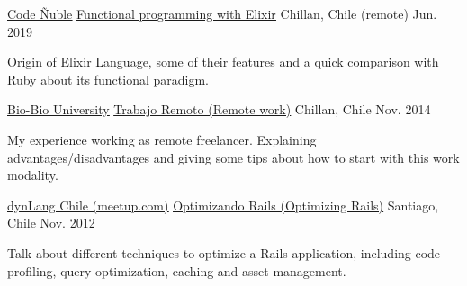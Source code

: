 

\begin{cventries}

  \cventry
    {\href{https://codenuble.cl/}{\underline{Code Ñuble}}} %
    {\href{https://alagos.github.io/elixir-talk}{\underline{Functional programming with Elixir}}} %
    {Chillan, Chile (remote)} %
    {Jun. 2019} %
    {
      \begin{cvitems} %
        \item {
          Origin of Elixir Language, some of their features and a quick comparison with Ruby about its functional paradigm.
        }
      \end{cvitems}
    }

  \cventry
    {\href{http://www.ubiobio.cl/}{\underline{Bio-Bio University}}} %
    {\href{https://alagos.github.io/trabajo-remoto}{\underline{Trabajo Remoto (Remote work)}}} %
    {Chillan, Chile} %
    {Nov. 2014} %
    {
      \begin{cvitems} %
        \item {
          My experience working as remote freelancer. Explaining advantages/disadvantages and giving some tips about how to start with this work modality.
        }
      \end{cvitems}
    }

  \cventry
    {\href{https://www.meetup.com/es-ES/starsconf/events/85184462/}{\underline{dynLang Chile (meetup.com)}}} %
    {\href{https://alagos.github.io/optimizando_rails}{\underline{Optimizando Rails (Optimizing Rails)}}} %
    {Santiago, Chile} %
    {Nov. 2012} %
    {
      \begin{cvitems} %
        \item {
          Talk about different techniques to optimize a Rails application, including code profiling, query optimization, caching and asset management.
        }
      \end{cvitems}
    }


\end{cventries}
